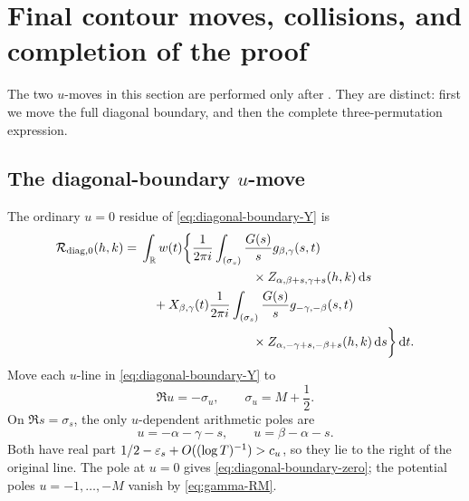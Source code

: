 \section{Final contour moves, collisions, and completion of the proof}
\label{sec:final}

The two $u$-moves in this section are performed only after
.  They are distinct: first we move the
full diagonal boundary, and then the complete three-permutation expression.

\subsection{The diagonal-boundary \texorpdfstring{$u$}{u}-move}

The ordinary $u=0$ residue of \eqref{eq:diagonal-boundary-Y} is
\begin{align}
 \mathcal R_{\mathrm{diag},0}(h,k)
 ={}&\int_{\R}w(t)\bigg\{
 \frac{1}{2\pi i}\int_{(\sigma_s)}\frac{G(s)}s
 g_{\beta,\gamma}(s,t)\notag\\
 &\hspace{31mm}\times
 Z_{\alpha,\beta+s,\gamma+s}(h,k)\dd s\notag\\
 &\quad+X_{\beta,\gamma}(t)
 \frac{1}{2\pi i}\int_{(\sigma_s)}\frac{G(s)}s
 g_{-\gamma,-\beta}(s,t)\notag\\
 &\hspace{31mm}\times
 Z_{\alpha,-\gamma+s,-\beta+s}(h,k)\dd s
 \bigg\}\dd t.
 \label{eq:diagonal-boundary-zero}
\end{align}
Move each $u$-line in \eqref{eq:diagonal-boundary-Y} to
\begin{equation}\label{eq:boundary-u-line}
                  \Re u=-\sigma_u,\qquad \sigma_u=M+\frac12.
\end{equation}
On $\Re s=\sigma_s$, the only $u$-dependent arithmetic poles are
\begin{equation}\label{eq:boundary-arithmetic-poles}
                  u=-\alpha-\gamma-s,\qquad
                  u=\beta-\alpha-s.
\end{equation}
Both have real part $1/2-\varepsilon_s+O((\log T)^{-1})>c_u$, so they lie to the
right of the original line.  The pole at $u=0$ gives
\eqref{eq:diagonal-boundary-zero}; the potential poles
$u=-1,\ldots,-M$ vanish by \eqref{eq:gamma-RM}.

